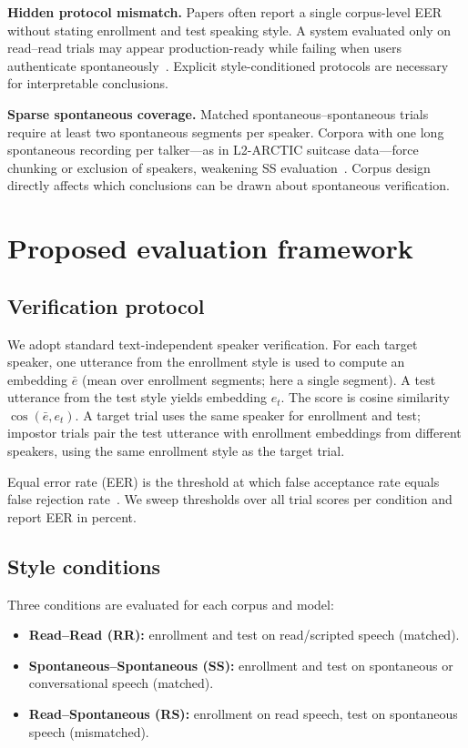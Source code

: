\documentclass[cameraready]{Interspeech}
\begin{document}
\textbf{Hidden protocol mismatch.} Papers often report a single corpus-level EER without stating enrollment and test speaking style. A system evaluated only on read--read trials may appear production-ready while failing when users authenticate spontaneously~\cite{tom2010style}. Explicit style-conditioned protocols are necessary for interpretable conclusions.

\textbf{Sparse spontaneous coverage.} Matched spontaneous--spontaneous trials require at least two spontaneous segments per speaker. Corpora with one long spontaneous recording per talker---as in L2-ARCTIC suitcase data---force chunking or exclusion of speakers, weakening SS evaluation~\cite{zhao2018l2arctic}. Corpus design directly affects which conclusions can be drawn about spontaneous verification.

\section{Proposed evaluation framework}
\label{sec:method}

\subsection{Verification protocol}

We adopt standard text-independent speaker verification. For each target speaker, one utterance from the enrollment style is used to compute an embedding $\bar{e}$ (mean over enrollment segments; here a single segment). A test utterance from the test style yields embedding $e_t$. The score is cosine similarity $\cos(\bar{e}, e_t)$. A target trial uses the same speaker for enrollment and test; impostor trials pair the test utterance with enrollment embeddings from different speakers, using the same enrollment style as the target trial.

Equal error rate (EER) is the threshold at which false acceptance rate equals false rejection rate~\cite{snyder2018xvector}. We sweep thresholds over all trial scores per condition and report EER in percent.

\subsection{Style conditions}

Three conditions are evaluated for each corpus and model:
\begin{itemize}
  \item \textbf{Read--Read (RR):} enrollment and test on read/scripted speech (matched).
  \item \textbf{Spontaneous--Spontaneous (SS):} enrollment and test on spontaneous or conversational speech (matched).
  \item \textbf{Read--Spontaneous (RS):} enrollment on read speech, test on spontaneous speech (mismatched).
\end{itemize}
\end{document}
